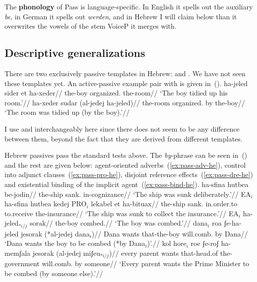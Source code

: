 The \textbf{phonology} of Pass is language-specific. In English it spells out the auxiliary \emph{be}, in German it spells out \emph{werden}, and in Hebrew I will claim below than it overwrites the vowels of the stem VoiceP it merges with.


	\subsection{Descriptive generalizations} \label{passn:pass:tpua}
There are two exclusively passive templates in Hebrew: {\tpua} and {\thuf}. We have not seen these templates yet. An active-passive example pair with {\tpua} is given in~(\nextx).
\pex
	\a \begingl
		\gla ha-jeled sider et ha-xeder//
		\glb the-boy organized.  the-room//
		\glft `The boy tidied up his room.'//
	\endgl
	\a \begingl
		\gla ha-xeder sudar (al-jedej ha-jeled)//
		\glb the-room organized. by the-boy//
		\glft `The room was tidied up (by the boy).'//
	\endgl
\xe

I use {\tpua} and {\thuf} interchangeably here since there does not seem to be any difference between them, beyond the fact that they are derived from different templates.

Hebrew passives pass the standard tests above. The \emph{by}-phrase can be seen in~(\lastx) and the rest are given below: agent-oriented adverbs~(\ref{ex:pass-adv-he}), control into adjunct clauses~(\ref{ex:pass-pro-he}), disjoint reference effects~(\ref{ex:pass-dre-he}) and existential binding of the implicit agent~(\ref{ex:pass-bind-he}).
\ex \label{ex:pass-adv-he} \begingl
	\gla ha-sfina hutbea be-jodin//
	\glb the-ship sank. in-cognizance//
	\glft `The ship was sunk deliberately.'//
	\endgl
\xe
\ex \label{ex:pass-pro-he} \begingl
	\gla EA$_i$ ha-sfina hutbea kedej PRO$_i$ lekabel et ha-bituax//
	\glb {} the-ship sank. in.order.to {} to.receive  the-insurance//
	\glft `The ship was sunk to collect the insurance.'//
	\endgl
\xe 
\ex \label{ex:pass-dre-he}
	\begingl
	\gla EA$_i$ ha-jeled$_{*i/j}$ sorak//
	\glb {} the-boy combed.//
	\glft `The boy was combed.'//
	\endgl
\xe
\pex \label{ex:pass-bind-he}
	\a \begingl
		\gla dana$_i$ ro{\ts}a ʃe-ha-jeled jesorak (*al-jedej dana$_i$)//
		\glb Dana wants that-the-boy will.comb. by Dana//
		\glft `Dana wants the boy to be combed (*by Dana$_i$)'.//
		\endgl
	\a \begingl
		\gla kol hore$_i$ ro{\ts}e ʃe-roʃ ha-memʃala jesorak (al-jedej miʃeu$_{*i/j}$)//
		\glb every parent wants that-head.of the-government will.comb. by someone//
		\glft `Every parent wants the Prime Minister to be combed (by someone else).'//
		\endgl
\xe


